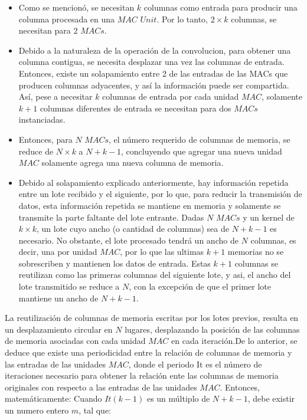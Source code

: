 \begin{itemize}
\item Como se mencionó,  se necesitan $k$ columnas como entrada para producir una columna procesada en una $MAC$ $Unit$. Por lo tanto, $2 \times k$ columnas, se necesitan para $2$ $MACs$.
\item Debido a la naturaleza de la operación de la convolucion, para obtener una columna contigua, se necesita desplazar una vez las columnas de entrada. Entonces, existe un solapamiento entre 2 de las entradas de las MACs que producen columnas adyacentes, y así la información puede ser compartida.
  Así, pese a necesitar $k$ columnas de entrada por cada unidad $MAC$, solamente $k+1$ columnas diferentes de entrada se necesitan para dos $MACs$ instanciadas.
\item Entonces, para $N$ $MACs$, el número requerido de columnas de memoria, se reduce de $N \times k$ a $N+k-1$, concluyendo que agregar una nueva unidad $MAC$ solamente agrega una nueva columna de memoria.
\item Debido al solapamiento explicado anteriormente, hay información repetida entre un lote recibido y el siguiente, por lo que, para reducir la transmisión de datos, esta información repetida se mantiene en memoria y solamente se transmite la parte faltante del lote entrante.
Dadas $N$ $MACs$ y  un kernel de $k \times k$, un lote cuyo ancho (o cantidad de columnas) sea de $N+k-1$ es necesario. No obstante, el lote procesado tendrá un ancho de  $N$ columnas, es decir, una por unidad $MAC$, por lo que las ultimas $k+1$ memorias no se sobrescriben y mantienen los datos de entrada. Estas $k+1$ columnas se reutilizan como las primeras columnas del siguiente lote, y asi, el ancho del lote transmitido se reduce a $N$, con la excepción de que el primer lote mantiene un ancho de $N+k-1$.
\end{itemize}

La reutilización de columnas de memoria escritas por los lotes previos, resulta en un desplazamiento circular en $N$ lugares, desplazando la posición de las columnas de memoria asociadas con cada unidad $MAC$ en cada iteración.De lo anterior, se deduce que existe una periodicidad entre la relación de columnas de memoria y las entradas de las unidades $MAC$, donde el periodo It es el número de iteraciones necesario para obtener la relación ente las columnas de memoria originales con respecto a las entradas de las unidades $MAC$.
Entonces, matemáticamente: Cuando $It(k-1)$ es un múltiplo de $N+k-1$, debe existir un numero entero $m$, tal que:

